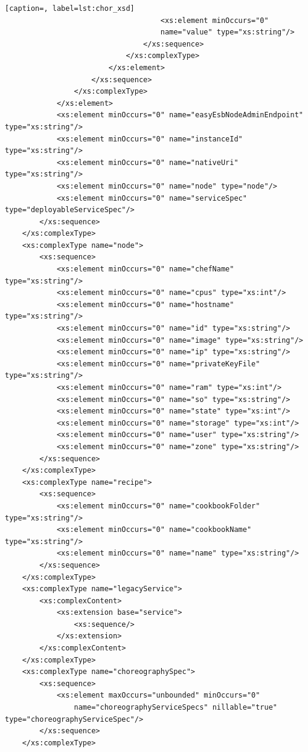 \documentclass[a4paper, 10pt]{article}
\begin{document}
{\begin{lstlisting}[caption=, label=lst:chor_xsd]
                                    <xs:element minOccurs="0"
                                    name="value" type="xs:string"/>
                                </xs:sequence>
                            </xs:complexType>
                        </xs:element>
                    </xs:sequence>
                </xs:complexType>
            </xs:element>
            <xs:element minOccurs="0" name="easyEsbNodeAdminEndpoint" type="xs:string"/>
            <xs:element minOccurs="0" name="instanceId" type="xs:string"/>
            <xs:element minOccurs="0" name="nativeUri" type="xs:string"/>
            <xs:element minOccurs="0" name="node" type="node"/>
            <xs:element minOccurs="0" name="serviceSpec" type="deployableServiceSpec"/>
        </xs:sequence>
    </xs:complexType>
    <xs:complexType name="node">
        <xs:sequence>
            <xs:element minOccurs="0" name="chefName" type="xs:string"/>
            <xs:element minOccurs="0" name="cpus" type="xs:int"/>
            <xs:element minOccurs="0" name="hostname" type="xs:string"/>
            <xs:element minOccurs="0" name="id" type="xs:string"/>
            <xs:element minOccurs="0" name="image" type="xs:string"/>
            <xs:element minOccurs="0" name="ip" type="xs:string"/>
            <xs:element minOccurs="0" name="privateKeyFile" type="xs:string"/>
            <xs:element minOccurs="0" name="ram" type="xs:int"/>
            <xs:element minOccurs="0" name="so" type="xs:string"/>
            <xs:element minOccurs="0" name="state" type="xs:int"/>
            <xs:element minOccurs="0" name="storage" type="xs:int"/>
            <xs:element minOccurs="0" name="user" type="xs:string"/>
            <xs:element minOccurs="0" name="zone" type="xs:string"/>
        </xs:sequence>
    </xs:complexType>
    <xs:complexType name="recipe">
        <xs:sequence>
            <xs:element minOccurs="0" name="cookbookFolder" type="xs:string"/>
            <xs:element minOccurs="0" name="cookbookName" type="xs:string"/>
            <xs:element minOccurs="0" name="name" type="xs:string"/>
        </xs:sequence>
    </xs:complexType>
    <xs:complexType name="legacyService">
        <xs:complexContent>
            <xs:extension base="service">
                <xs:sequence/>
            </xs:extension>
        </xs:complexContent>
    </xs:complexType>
    <xs:complexType name="choreographySpec">
        <xs:sequence>
            <xs:element maxOccurs="unbounded" minOccurs="0"
                name="choreographyServiceSpecs" nillable="true" type="choreographyServiceSpec"/>
        </xs:sequence>
    </xs:complexType>

\end{lstlisting}}
\end{document}
